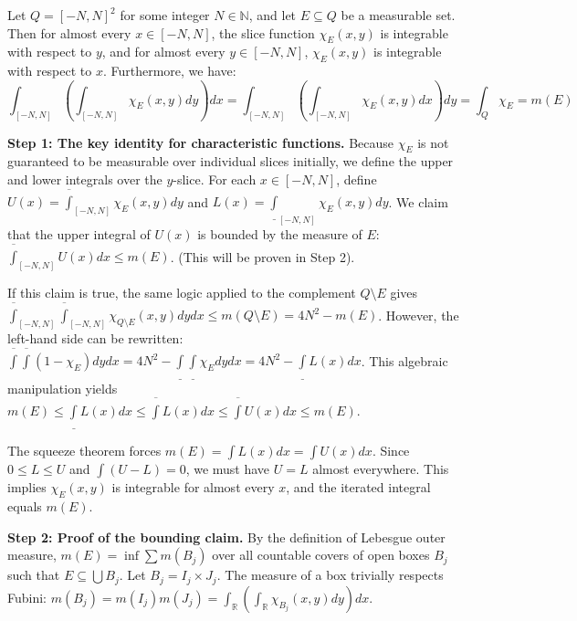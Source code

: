 \begin{lemma}
    Let $Q = [-N,N]^2$ for some integer $N \in \mathbb{N}$, and let $E \subseteq Q$ be a measurable set. Then for almost every $x \in [-N,N]$, the slice function $\chi_E(x,y)$ is integrable with respect to $y$, and for almost every $y \in [-N,N]$, $\chi_E(x,y)$ is integrable with respect to $x$. Furthermore, we have:
    $$ \int_{[-N,N]} \left( \int_{[-N,N]} \chi_E(x,y) dy \right) dx = \int_{[-N,N]} \left( \int_{[-N,N]} \chi_E(x,y) dx \right) dy = \int_{Q} \chi_E = m(E) $$
\end{lemma}

\begin{pfbox}
    \textbf{Step 1: The key identity for characteristic functions.}
    Because $\chi_E$ is not guaranteed to be measurable over individual slices initially, we define the upper and lower integrals over the $y$-slice.
    For each $x \in [-N,N]$, define $U(x) = \overline{\int}_{[-N,N]} \chi_E(x,y)dy$ and $L(x) = \underline{\int}_{[-N,N]} \chi_E(x,y)dy$.
    We claim that the upper integral of $U(x)$ is bounded by the measure of $E$: $\overline{\int}_{[-N,N]} U(x)dx \le m(E)$. (This will be proven in Step 2).
    
    If this claim is true, the same logic applied to the complement $Q \setminus E$ gives $\overline{\int}_{[-N,N]} \overline{\int}_{[-N,N]} \chi_{Q \setminus E}(x,y)dydx \le m(Q \setminus E) = 4N^2 - m(E)$.
    However, the left-hand side can be rewritten: $\overline{\int} \overline{\int} (1 - \chi_E)dydx = 4N^2 - \underline{\int} \underline{\int} \chi_E dydx = 4N^2 - \underline{\int} L(x)dx$.
    This algebraic manipulation yields $m(E) \le \underline{\int} L(x)dx \le \overline{\int} L(x)dx \le \overline{\int} U(x)dx \le m(E)$.
    
    The squeeze theorem forces $m(E) = \int L(x)dx = \int U(x)dx$. Since $0 \le L \le U$ and $\int (U-L) = 0$, we must have $U=L$ almost everywhere. This implies $\chi_E(x,y)$ is integrable for almost every $x$, and the iterated integral equals $m(E)$.

    \textbf{Step 2: Proof of the bounding claim.}
    By the definition of Lebesgue outer measure, $m(E) = \inf \displaystyle\sum m(B_j)$ over all countable covers of open boxes $B_j$ such that $E \subseteq \bigcup B_j$. Let $B_j = I_j \times J_j$. The measure of a box trivially respects Fubini: $m(B_j) = m(I_j)m(J_j) = \int_\mathbb{R} \left(\int_\mathbb{R} \chi_{B_j}(x,y)dy\right)dx$.
    

\end{pfbox}
